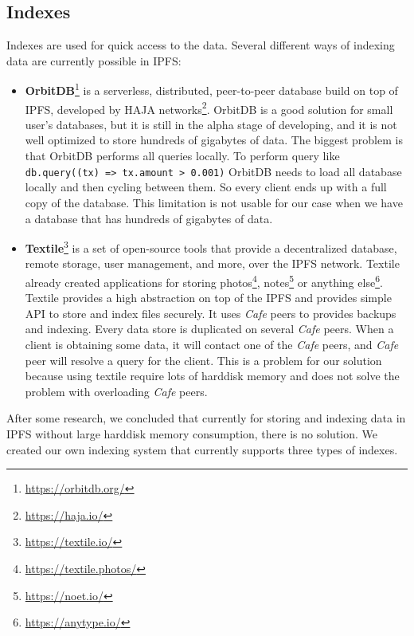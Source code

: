 \subsection{Indexes}
Indexes are used for quick access to the data. Several different ways of indexing data are currently possible in IPFS:
\begin{itemize}
    \item \textbf{OrbitDB}\footnote{\url{https://orbitdb.org/}} is a serverless, distributed, peer-to-peer database build on top of IPFS, developed by HAJA networks\footnote{\url{https://haja.io/}}. OrbitDB is a good solution for small user's databases, but it is still in the alpha stage of developing, and it is not well optimized to store hundreds of gigabytes of data. The biggest problem is that OrbitDB performs all queries locally. To perform query like \texttt{db.query((tx) => tx.amount > 0.001)} OrbitDB needs to load all database locally and then cycling between them. So every client ends up with a full copy of the database. This limitation is not usable for our case when we have a database that has hundreds of gigabytes of data.
    \cite{OrbitDBManual}
    \item \textbf{Textile}\footnote{\url{https://textile.io/}} is a set of open-source tools that provide a decentralized database, remote storage, user management, and more, over the IPFS network. Textile already created applications for storing photos\footnote{\url{https://textile.photos/}}, notes\footnote{\url{https://noet.io/}} or anything else\footnote{\url{https://anytype.io/}}. Textile provides a high abstraction on top of the IPFS and provides simple API to store and index files securely. It uses \textit{Cafe} peers to provides backups and indexing. Every data store is duplicated on several \textit{Cafe} peers. When a client is obtaining some data, it will contact one of the \textit{Cafe} peers, and \textit{Cafe} peer will resolve a query for the client. This is a problem for our solution because using textile require lots of harddisk memory and does not solve the problem with overloading \textit{Cafe} peers.
    \cite{TextileWhitePaper}
\end{itemize}

After some research, we concluded that currently for storing and indexing data in IPFS without large harddisk memory consumption, there is no solution. We created our own indexing system that currently supports three types of indexes.

